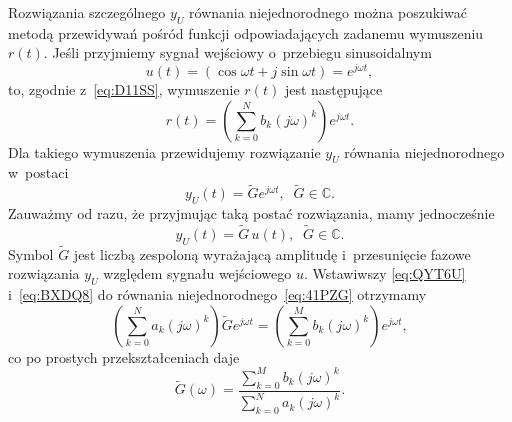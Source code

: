 \documentclass[paper=a4,DIV=12]{lpas}
\begin{document}
Rozwiązania szczególnego $y_U$ równania niejednorodnego można poszukiwać
metodą przewidywań pośród funkcji odpowiadających zadanemu wymuszeniu $r(t)$.
Jeśli przyjmiemy sygnał wejściowy o~przebiegu sinusoidalnym
\begin{equation}
  u(t) = \left(\cos{\omega t} + j \sin{\omega t} \right)
                  = e^{j \omega t},
  \label{eq:HP9M8}
\end{equation}
to, zgodnie z~\eqref{eq:D11SS}, wymuszenie $r(t)$ jest następujące
\begin{equation}
  r(t)
  = \left( \sum_{k=0}^{N}{b_k \left(j\omega\right)^k} \right) e^{j \omega t}.
  \label{eq:BXDQ8}
\end{equation}
Dla takiego wymuszenia przewidujemy rozwiązanie $y_U$ równania
niejednorodnego w~postaci
\begin{equation}
  y_U(t) = \tilde{G} e^{j \omega t},
  \;\; \tilde{G} \in \mathbb{C}.
  \label{eq:QYT6U}
\end{equation}
Zauważmy od razu, że przyjmując taką postać rozwiązania, mamy jednocześnie
\begin{equation}
  y_U(t) = \tilde{G} \, u(t),
  \;\; \tilde{G} \in \mathbb{C}.
  \label{eq:W4GQ5}
\end{equation}
Symbol $\tilde{G}$ jest liczbą zespoloną wyrażającą amplitudę i~przesunięcie
fazowe rozwiązania $y_U$ względem sygnału wejściowego $u$. Wstawiwszy
\eqref{eq:QYT6U} i~\eqref{eq:BXDQ8} do równania
niejednorodnego~\eqref{eq:41PZG} otrzymamy
\begin{equation}
  \left(\sum_{k = 0}^{N} a_k \left({j \omega}\right)^{k}\right) \tilde{G} e^{j \omega t}
  =
  \left(\sum_{k = 0}^{M} b_k \left({j \omega}\right)^{k}\right) e^{j \omega t},
  \label{eq:GZ5EX}
\end{equation}
co po prostych przekształceniach daje
\begin{equation}
  \tilde{G}\left(\omega\right) = \frac{
    \sum_{k = 0}^{M} b_k \left({j \omega}\right)^{k}
  } {
    \sum_{k = 0}^{N} a_k \left({j \omega}\right)^{k}
  }.
  \label{eq:T8N4Z}
\end{equation}
\end{document}
